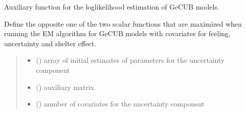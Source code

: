 \documentclass[letterpaper,10pt,english]{sphinxmanual}
\begin{document}

\begin{fulllineitems}
\label{\detokenize{cubmods:cubmods.cubsh_ywx.Q1}}
\pysigstartsignatures
{}
\pysigstopsignatures
\sphinxAtStartPar
Auxiliary function for the log\sphinxhyphen{}likelihood estimation of GeCUB models.

\sphinxAtStartPar
Define the opposite one of the two scalar functions that are maximized when running the E\sphinxhyphen{}M algorithm
for GeCUB models with covariates for feeling, uncertainty and shelter effect.
\begin{quote}\begin{description}
\begin{itemize}
\item {} 
\sphinxAtStartPar
{} () \textendash{} array of initial estimates of parameters for the uncertainty component

\item {} 
\sphinxAtStartPar
{} () \textendash{} auxiliary matrix

\item {} 
\sphinxAtStartPar
{} () \textendash{} number of covariates for the uncertainty component

\end{itemize}

\end{description}\end{quote}

\end{fulllineitems}

\end{document}
